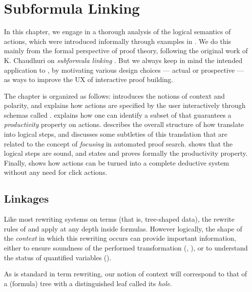\setchapterpreamble[u]{\margintoc}
\chapter{Subformula Linking}

In this chapter, we engage in a thorough analysis of the logical semantics of
 actions, which were introduced informally through examples in .
We do this mainly from the formal perspective of  proof theory,
following the original work of K. Chaudhuri on \emph{subformula linking}
\cite{Chaudhuri2013}. But we always keep in mind the intended application to
, by motivating various design choices --- actual or prospective
--- as ways to improve the UX of interactive proof building.

The chapter is organized as follows:  introduces the notions of
context and polarity, and explains how  actions are specified by the user
interactively through schemas called \emph{}.  explains
how one can identify a subset of  that guarantees a \emph{productivity}
property on  actions.  describes the overall structure of how
 translate into logical steps, and  discusses some
subtleties of this translation that are related to the concept of
\emph{focusing} in automated proof search.  shows that the
logical steps are sound, and  states and proves formally
the productivity property. Finally,  shows how 
actions can be turned into a complete deductive system without any need for
click actions.

\section{Linkages}

Like most rewriting systems on terms (that is, tree-shaped data), the rewrite
rules of  and  apply at any depth inside formulas.
However logically, the shape of the \emph{context} in which this rewriting
occurs can provide important information, either to ensure soundness of the
performed transformation (, ), or to
understand the status of quantified variables ().

As is standard in term rewriting, our notion of context will correspond to that
of a (formula) tree with a distinguished leaf called its \emph{hole}.

